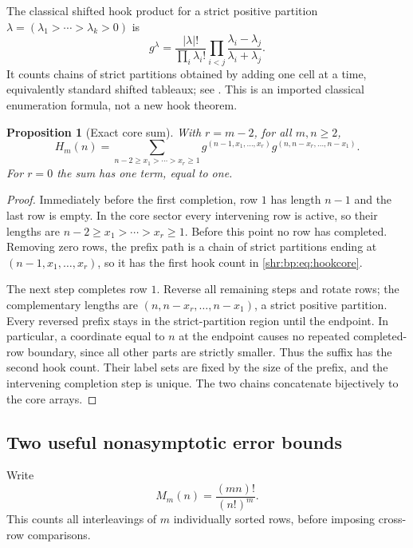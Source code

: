 \documentclass[11pt,letterpaper]{article}
\numberwithin{equation}{section}
\newtheorem{proposition}[theorem]{Proposition}
\theoremstyle{definition}
\newcommand{\1}{\mathbf 1}
\begin{document}
The classical shifted hook product for a strict positive partition
$\lambda=(\lambda_1>\cdots>\lambda_k>0)$ is
\begin{equation}
 g^\lambda=
 \frac{|\lambda|!}{\prod_i\lambda_i!}
 \prod_{i<j}\frac{\lambda_i-\lambda_j}{\lambda_i+\lambda_j}.
 \label{shr:bp:eq:hook}
\end{equation}
It counts chains of strict partitions obtained by adding one cell at a
time, equivalently standard shifted tableaux; see \cite{Sun}. This is an
imported classical enumeration formula, not a new hook theorem.

\begin{proposition}[Exact core sum]
\label{shr:bp:prop:core}
With $r=m-2$, for all $m,n\ge2$,
\begin{equation}
 H_m(n)=
 \sum_{n-2\ge x_1>\cdots>x_r\ge1}
 g^{(n-1,x_1,\ldots,x_r)}
 g^{(n,n-x_r,\ldots,n-x_1)}.
 \label{shr:bp:eq:hookcore}
\end{equation}
For $r=0$ the sum has one term, equal to one.
\end{proposition}
\begin{proof}
Immediately before the first completion, row $1$ has length $n-1$ and
the last row is empty. In the core sector every intervening row is
active, so their lengths are $n-2\ge x_1>\cdots>x_r\ge1$.
Before this point no row has completed. Removing zero rows, the prefix
path is a chain of strict partitions ending at $(n-1,x_1,\ldots,x_r)$,
so it has the first hook count in \eqref{shr:bp:eq:hookcore}.

The next step completes row $1$. Reverse all remaining steps and rotate
rows; the complementary lengths are $(n,n-x_r,\ldots,n-x_1)$, a strict
positive partition. Every reversed prefix stays in the strict-partition
region until the endpoint. In particular, a coordinate equal to $n$ at
the endpoint causes no repeated completed-row boundary, since all other
parts are strictly smaller. Thus the suffix has the second hook count.
Their label sets are fixed by the size of the prefix, and the intervening
completion step is unique. The two chains concatenate bijectively to the
core arrays.
\end{proof}

\subsection{Two useful nonasymptotic error bounds}
Write
\begin{equation}
 M_m(n)=\frac{(mn)!}{(n!)^m}.
 \label{shr:bp:eq:Mtotal}
\end{equation}
This counts all interleavings of $m$ individually sorted rows, before
imposing cross-row comparisons.
\end{document}
